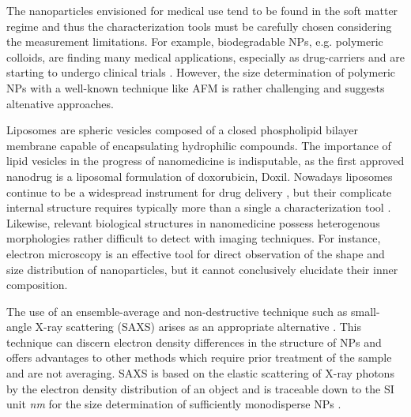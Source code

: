 The nanoparticles envisioned for medical use tend to be found in the soft matter regime and thus the characterization tools must be carefully chosen considering the measurement limitations. For example, biodegradable NPs, e.g. polymeric colloids, are finding many medical applications, especially as drug-carriers \citep{kattan_phase_1992,vicent_polymer_2006} and are starting to undergo clinical trials \citep{patel_polymeric_2012,beija_colloidal_2012,cabral_progress_2014}. However, the size determination of polymeric NPs with a well-known technique like AFM is rather challenging \citep{wu_particle_2014} and suggests altenative approaches.

Liposomes are spheric vesicles composed of a closed phospholipid bilayer membrane capable of encapsulating hydrophilic compounds. The importance of lipid vesicles in the progress of nanomedicine is indisputable, as the first approved nanodrug is a liposomal formulation of doxorubicin, Doxil. Nowadays liposomes continue to be a widespread instrument for drug delivery \citep{perez-herrero_advanced_2015}, but their complicate internal structure requires typically more than a single a characterization tool \citep{khorasani_closing_2014}. Likewise, relevant biological structures in nanomedicine possess heterogenous morphologies rather difficult to detect with imaging techniques. For instance, electron microscopy is an effective tool for direct observation of the shape and size distribution of nanoparticles, but it cannot conclusively elucidate their inner composition.

The use of an ensemble-average and non-destructive technique such as small-angle X-ray scattering (SAXS) arises as an appropriate alternative \citep{leonard_jr_size_1952,motzkus_untersuchung_1959}. This technique can discern electron density differences in the structure of NPs and offers advantages to other methods which require prior treatment of the sample and are not averaging. SAXS is based on the elastic scattering of X-ray photons by the electron density distribution of an object and is traceable down to the SI unit \emph{nm} for the size determination of sufficiently monodisperse NPs \citep{meli_traceable_2012}. 

